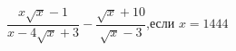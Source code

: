 \begin{ex}[type=simplify_calculate]
	\begin{condition}
		\( \dfrac{x\sqrt{x}-1}{x-4\sqrt{x}+3}-\dfrac{\sqrt{x}+10}{\sqrt{x}-3} \),\quad если \( x=1444 \)
	\end{condition}
\end{ex}